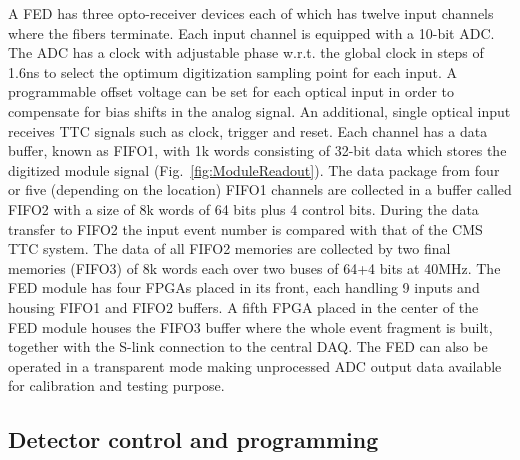 A FED has three opto-receiver devices each of which has twelve input channels where the fibers terminate. Each input channel is equipped with a 10-bit ADC.
The ADC has a clock with adjustable phase w.r.t. the global clock in steps of 1.6\unit{ns} to select the optimum digitization sampling point for each input.
A programmable offset voltage can be set for each optical input in order to compensate for bias shifts in the analog signal.
An additional, single optical input receives TTC signals such as clock, trigger and reset.
Each channel has a data buffer, known as FIFO1, with 1k words consisting of 32-bit data which stores the digitized module signal (Fig.~\ref{fig:ModuleReadout}).
The data package from four or five (depending on the location) FIFO1 channels are collected in a buffer called FIFO2 with a size of 8k words of 64 bits plus 4 control bits.
During the data transfer to FIFO2 the input event number is compared with that of the CMS TTC system.
The data of all FIFO2 memories are collected by two final memories (FIFO3) of 8k words each over two buses of 64+4 bits at 40\unit{MHz}. 
The FED module has four FPGAs placed in its front, each handling 9 inputs and housing FIFO1 and FIFO2 buffers.
A fifth FPGA placed in the center of the FED module houses the FIFO3 buffer where the whole event fragment is built,
together with the S-link connection to the central DAQ.
The FED can also be operated in a transparent mode making unprocessed ADC output data available for calibration and testing purpose. 

\subsection{Detector control and programming}

